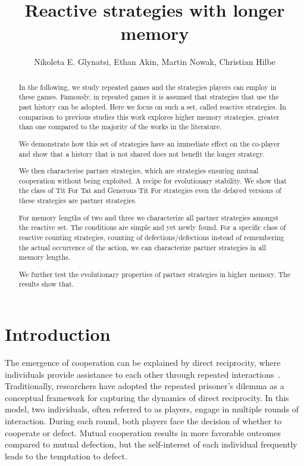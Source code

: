 \documentclass{article}
\title{Reactive strategies with longer memory}
\author{Nikoleta E. Glynatsi, Ethan Akin, Martin Nowak, Christian Hilbe}
\date{}
\theoremstyle{definition}
\begin{document}
\maketitle

\begin{abstract}

In the following, we study repeated games and the strategies players can
employ in these games. Famously, in repeated games it is assumed that
strategies that use the past history can be adopted. Here we focus on such a
set, called reactive strategies. In comparison to previous studies this work
explores higher memory strategies, greater than one compared to the majority
of the works in the literature.

We demonstrate how this set of strategies have an immediate effect on the
co-player and show that a history that is not shared does not benefit the
longer strategy.

We then characterise partner strategies, which are strategies ensuring mutual
cooperation without being exploited. A recipe for evolutionary stability. We
show that the class of Tit For Tat and Generous Tit For strategies even the
delayed versions of these strategies are partner strategies.

For memory lengths of two and three we characterize all partner strategies
amongst the reactive set. The conditions are simple and yet newly found. For a
specific class of reactive counting strategies, counting of
defections/defections instead of remembering the actual occurrence of the
action, we can characterize partner strategies in all memory lengths.

We further test the evolutionary properties of partner strategies in higher
memory. The results show that.


\end{abstract}

\section{Introduction}

The emergence of cooperation can be explained by direct reciprocity, where
individuals provide assistance to each other through repeated interactions~\cite{axelrod:AAAS:1981,
nowak:Science:2006, sigmund2010}. Traditionally, researchers have adopted the repeated prisoner's dilemma
as a conceptual framework for capturing the dynamics of direct reciprocity. In
this model, two individuals, often referred to as players, engage in multiple
rounds of interaction. During each round, both players face the decision of
whether to cooperate or defect. Mutual cooperation results in more favorable
outcomes compared to mutual defection, but the self-interest of each individual
frequently leads to the temptation to defect.
\end{document}
